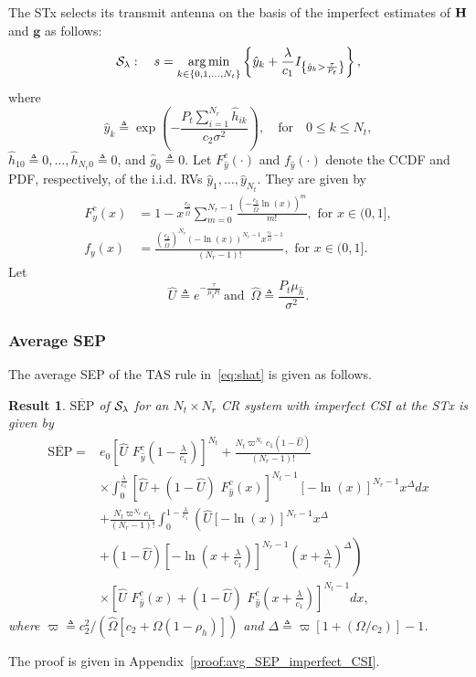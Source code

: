 \documentclass[journal]{IEEEtran}
\newtheorem{result}{{\bf Result}}
\newcommand{\cbrac}[1]{\left\{{#1}\right\}}
\newcommand{\indic}[1]{I_{\cbrac{#1}}}
\newcommand{\define}{\triangleq}
\newcommand{\mtx}[1]{{\bf #1}} %
\DeclareMathOperator*{\argmin}{arg\,min}
\newcommand{\SEP}{\text{SEP}}
\newcommand{\nx}{{0}}
\newcommand{\lam}{\lambda}
\newcommand{\Nt}{{N_t}}
\newcommand{\Nr}{{N_r}}
\newcommand{\Pt}{{P_t}}
\newcommand{\such}{h}
\newcommand{\puch}{g}
\newcommand{\g}{\mathbf{\puch}}
\newcommand{\noisevar}{\sigma^2}
\newcommand{\itau}{\tau}
\newcommand{\cone}{c_{1}}
\newcommand{\ctwo}{c_{2}}
\newcommand{\taubypt}{\frac{\itau}{\Pt}}
\newcommand{\gkhatgrtaubypt}[1]{{\gkhat{#1}}>\taubypt}
\newcommand{\ghatindic}[1]{\indic{\gkhatgrtaubypt{#1}}}
\newcommand{\lambycone}{\frac{\lam}{\cone}}
\newcommand{\ykhatplusgkhat}[1]{ \ykhat{#1} + \lambycone\ghatindic{#1}}
\newcommand{\al}{\ctwo}
\newcommand{\snr}{\Omega}
\newcommand{\snrbyalinl}[1][]{{\snr#1}/{\al}}
\newcommand{\un}{U}
\newcommand{\allopts}{\left\{\nx,1,\ldots,\Nt\right\}}
\newcommand{\zerosep}{e_0}
\newcommand{\Hmx}{\mtx{H}}
\newcommand{\callamrule}{{\cal S_{{\lam}}}}
\newcommand{\avgSEP}{\overline{\SEP}}
\newcommand{\unhat}{\widehat{\un}}
\newcommand{\snrhat}{\widehat{\snr}}
\newcommand{\hhat}{\hat{\such}}
\newcommand{\ghat}{\hat{\puch}}
\newcommand{\yhat}{\hat{y}}
\newcommand{\hkhat}[1]{\hhat_{#1}}
\newcommand{\gkhat}[1]{\ghat_{#1}}
\newcommand{\ykhat}[1]{\hat{y}_{#1}}
\newcommand{\muhhat}{\mu_{\hhat}}
\newcommand{\mughat}{\mu_{\ghat}}
\newcommand{\ccdfghat}[1][]{e^{-\frac{{#1}\itau}{\mughat\Pt}}}
\newcommand{\albysnrhat}[1][]{\frac{\al#1}{\snrhat}}
\newcommand{\rhoh}{\rho_h}
\newcommand{\Tc}{{\ctwo^2}/\left({\snrhat\left[\ctwo + \snr\left(1 - \rhoh \right)  \right] }\right) }
\newcommand{\T}{\varpi}
\newcommand{\Dc}{\T \left[ 1 + \left( \snrbyalinl\right) \right] -1}
\newcommand{\pdfyNrgen}[1]{f_{y}\left(#1\right)} %
\newcommand{\ccdfyrv}[1]{ F^{c}_{y}\left(#1 \right) }
\newcommand{\ccdfyhatrv}[1]{F^{c}_{\yhat}\left(#1 \right) }
\newcommand{\D}{\Delta}
\newcommand{\yhattimespdfyNr}{\left[-\ln(x)\right]^{\Nr-1}\!x^{\D}} %
\newcommand{\yhatpluslamtimespdfyNr}{\left[-\ln\!\left({x\!+\!\lambycone}\right)\right]^{\Nr-1}\!\left(x+\lambycone\right)^{\!\D}} %
\newcommand{\unccdfyhat}[2]{{#1}\,\,\ccdfyhatrv{#2}}
\begin{document}
The STx selects its transmit antenna on the basis of the imperfect estimates of $\Hmx$ and $\g$ as follows:  
\begin{equation}
\callamrule:\quad s=\argmin\limits_{k\in\allopts} \left\{ \ykhatplusgkhat{k} \right\},
\label{eq:shat}
\end{equation}
%
where 
\begin{equation}
\ykhat{k} \define  \exp\left({- \frac{\Pt\sum_{i=1}^{\Nr}\hkhat{ik}}{\ctwo\noisevar} }\right), \quad \text{for} \quad 0\leq k \leq\Nt,
\label{eq:yihat_def}
\end{equation}
$\hkhat{1\nx} \define 0,\ldots,\hkhat{\Nr\nx} \define 0$, and $\gkhat{\nx} \define 0$. Let $F_{\yhat}^{c}(\cdot)$ and $f_{\yhat}(\cdot)$ denote the CCDF and PDF, respectively, of the i.i.d. RVs $\ykhat{1},\dots,\ykhat{\Nt}$. They are given by
%
\begin{align}
\label{eq:CCCDF_yhat}
\ccdfyrv{x} &= 1 - x^{\albysnrhat} \sum_{m=0}^{\Nr-1} \frac{\left(-\albysnrhat \ln(x) \right)^{m}}{m!}, \,\, \text{for}\,\, x \in (0,1],\\
\label{eq:pdfyNrhat}
\pdfyNrgen{x} &= \frac{\left(\albysnrhat\right)^{\Nr}\left(-\ln\left({x}\right)\right)^{\Nr-1}x^{\albysnrhat[]-1}}{(\Nr-1)!}, \,\, \text{for}\,\,  x \in (0,1].
\end{align}
Let 
\begin{equation}
\unhat\define\ccdfghat\, \text{and}\,\,\, \snrhat\define\frac{\Pt\muhhat}{\noisevar}.  
\end{equation}


\subsubsection{Average SEP} 
The average SEP of the TAS rule in~\eqref{eq:shat} is given as follows. 
\begin{result}
\label{thm:avg_SEP_imperfect}
$\avgSEP$ of $\callamrule$ for an $\Nt\times\Nr$ CR system with imperfect CSI at the STx is given by
\begin{align}
\label{eq:avg_SEP_imperfect}
\avgSEP =& \zerosep\left[\unccdfyhat{\unhat}{1-\lambycone}\right]^{\Nt}
+\frac{\Nt \T^{\Nr}\cone(1-\unhat)}{(\Nr-1)!}\nonumber\\
&\times \int_{0}^{\lambycone} \!\!\left[\unhat + \unccdfyhat{(1-\unhat)}{x}\right]^{\Nt-1}\!\! \yhattimespdfyNr dx\nonumber\\
& + \frac{\Nt \T^{\Nr}\cone}{(\Nr-1)!} \int_{0}^{1-\lambycone}
\left(  \unhat\yhattimespdfyNr
 \right. \nonumber \\
& + \left. (1-\unhat)\yhatpluslamtimespdfyNr \right) \nonumber \\
& \times \left[\unccdfyhat{\unhat}{x} + \unccdfyhat{(1-\unhat)}{x+\lambycone} \right]^{\Nt-1} dx,
\end{align}
where $\T \define \Tc$ and $\D \define \Dc$.    
\end{result}
\begin{IEEEproof}
	The proof is given in Appendix~\ref{proof:avg_SEP_imperfect_CSI}.
\end{IEEEproof}
\end{document}
